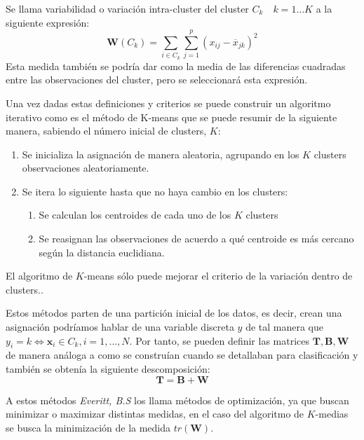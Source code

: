 \begin{defi}
Se llama variabilidad o variación intra-cluster del cluster $C_k\quad k=1\ldots K$ a la siguiente expresión:
\begin{equation}
\mathbf{W}(C_k)=\sum_{i\in C_k}\sum_{j=1}^{p} (x_{ij}-\overline{x}_{jk})^2
\end{equation}
\noindent Esta medida también se podría dar como la media de las diferencias cuadradas entre las observaciones del cluster, pero se seleccionará esta expresión. 
\end{defi}

\noindent Una vez dadas estas definiciones y criterios se puede construir un algoritmo iterativo como es el método de K-means que se puede resumir de la siguiente manera, sabiendo el número inicial de clusters, $K$:
\begin{enumerate}
\item Se inicializa la asignación de manera aleatoria, agrupando en los $K$ clusters observaciones aleatoriamente. 
\item Se itera lo siguiente hasta que no haya cambio en los clusters:
\begin{enumerate}
\item Se calculan los centroides de cada uno de los $K$ clusters
\item Se reasignan las observaciones de acuerdo a qué centroide es más cercano según la distancia euclidiana. 
\end{enumerate}
\end{enumerate}

\begin{propo}
El algoritmo de $K$-means sólo puede mejorar el criterio de la variación dentro de clusters.\cite{Scitovski 2021}. 
\end{propo}

\noindent Estos métodos parten de una partición inicial de los datos, es decir, crean una asignación podríamos hablar de una variable discreta $y$ de tal manera que $y_i=k\Leftrightarrow \mathbf{x}_i\in C_k, i=1,\ldots, N$. Por tanto, se pueden definir las matrices $\mathbf{T},\mathbf{B},\mathbf{W}$ de manera análoga a como se construían cuando se detallaban para clasificación y también se obtenía la siguiente descomposición:
\begin{equation}
\mathbf{T}=\mathbf{B}+\mathbf{W}
\end{equation}

\noindent A estos métodos \emph{Everitt, B.S} \cite{Everitt 2011} los llama métodos de optimización, ya que buscan minimizar o maximizar distintas medidas, en el caso del algoritmo de $K$-medias se busca la minimización de la medida $tr(\mathbf{W})$.


